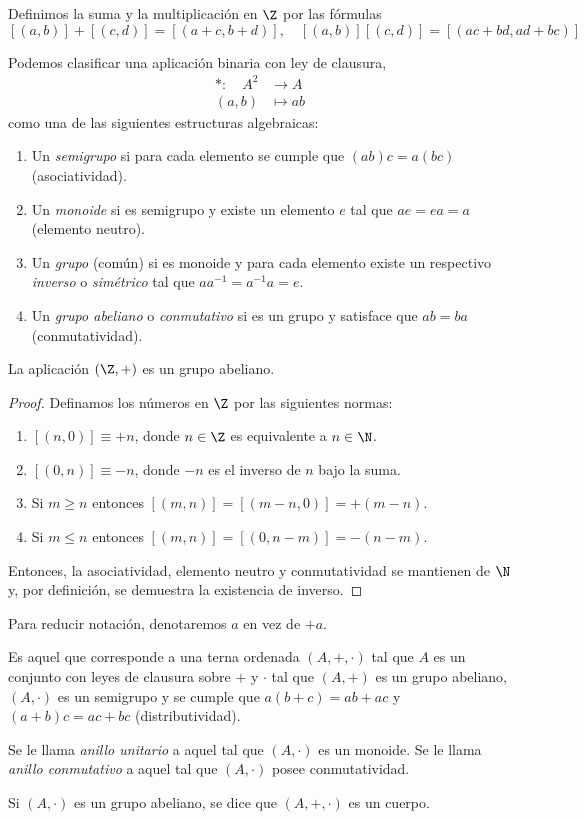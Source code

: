 \documentclass[11pt,oneside,a4paper]{book}
\begin{document}
Definimos la suma y la multiplicación en $\Z$ por las fórmulas
$$[(a,b)]+[(c,d)]=[(a+c,b+d)],\quad [(a,b)][(c,d)]=[(ac+bd,ad+bc)]$$
\begin{mydef}
Podemos clasificar una aplicación binaria con ley de clausura,
\begin{align*}
*:\quad A^2&\longrightarrow A\\
(a,b)&\longmapsto ab
\end{align*}
como una de las siguientes estructuras algebraicas:
\begin{enumerate}
\item Un \textit{semigrupo} si para cada elemento se cumple que $(ab)c=a(bc)$ (asociatividad).
\item Un \textit{monoide} si es semigrupo y existe un elemento $e$ tal que $ae=ea=a$ (elemento neutro).
\item Un \textit{grupo} (común) si es monoide y para cada elemento existe un respectivo \textit{inverso} o \textit{simétrico} tal que $aa^{-1}=a^{-1}a=e$.
\item Un \textit{grupo abeliano} o \textit{conmutativo} si es un grupo y satisface que $ab=ba$ (conmutatividad).
\end{enumerate}
\end{mydef}
\begin{thm}
La aplicación $(\Z,+)$ es un grupo abeliano.
\end{thm}
\begin{proof}
Definamos los números en $\Z$ por las siguientes normas:
\begin{enumerate}[$a$)]
\item $[(n,0)]\equiv+n$, donde $n\in\Z$ es equivalente a $n\in\N$.
\item $[(0,n)]\equiv-n$, donde $-n$ es el inverso de $n$ bajo la suma.
\item Si $m\geq n$ entonces $[(m,n)]=[(m-n,0)]=+(m-n)$.
\item Si $m\leq n$ entonces $[(m,n)]=[(0,n-m)]=-(n-m)$.
\end{enumerate}
Entonces, la asociatividad, elemento neutro y conmutatividad se mantienen de $\N$ y, por definición, se demuestra la existencia de inverso.
\end{proof}
Para reducir notación, denotaremos $a$ en vez de $+a$.
\begin{mydef}[Anillo]
Es aquel que corresponde a una terna ordenada $(A,+,\cdot)$ tal que $A$ es un conjunto con leyes de clausura sobre $+$ y $\cdot$ tal que $(A,+)$ es un grupo abeliano, $(A,\cdot)$ es un semigrupo y se cumple que $a(b+c)=ab+ac$ y $(a+b)c=ac+bc$ (distributividad).

Se le llama \textit{anillo unitario} a aquel tal que $(A,\cdot)$ es un monoide. Se le llama \textit{anillo conmutativo} a aquel tal que $(A,\cdot)$ posee conmutatividad.

Si $(A,\cdot)$ es un grupo abeliano, se dice que $(A,+,\cdot)$ es un cuerpo.
\end{mydef}
\end{document}
